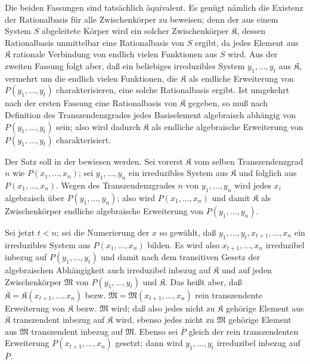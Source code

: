 Die beiden Fassungen sind tatsächlich äquivalent. Es genügt nämlich die Existenz der Rationalbasis für alle Zwischenkörper zu beweisen; denn der aus einem System $S$ abgeleitete Körper wird ein solcher Zwischenkörper $\mathfrak K$, dessen Rationalbasis unmittelbar eine Rationalbasis von $S$ ergibt, da jedes Element aus $\mathfrak K$ rationale Verbindung von endlich vielen Funktionen aus $S$ wird. Aus der zweiten Fassung folgt aber, daß ein beliebiges irreduzibles System $y_1,\ldots,y_t$ aus $\mathfrak K$, vermehrt um die endlich vielen Funktionen, die $\mathfrak K$ als endliche Erweiterung von $P(y_1,\ldots,y_t)$ charakterisieren, eine solche Rationalbasis ergibt. Ist umgekehrt nach der ersten Fassung eine Rationalbasis von $\mathfrak K$ gegeben, so muß nach Definition des Transzendenzgrades jedes Basiselement algebraisch abhängig von $P(y_1,\ldots,y_t)$ sein; also wird dadurch $\mathfrak K$ als endliche algebraische Erweiterung von $P(y_1,\ldots,y_t)$ charakterisiert.

Der Satz soll in der  bewiesen werden. Sei vorerst $\mathfrak K$ vom selben Transzendenzgrad $n$ wie $P(x_1,\ldots,x_n)$; sei $y_1,\ldots,y_n$ ein irreduzibles System aus $\mathfrak K$ und folglich aus $P(x_1,\ldots,x_n)$. Wegen des Transzendenzgrades $n$ von $y_1,\ldots,y_n$ wird jedes $x_i$ algebraisch über $P(y_1,\ldots,y_n)$; also wird $P(x_1,\ldots,x_n)$ und damit $\mathfrak K$ als Zwischenkörper endliche algebraische Erweiterung von $P(y_1,\ldots,y_n)$.

Sei jetzt $t<n$; sei die Numerierung der $x$ so gewählt, daß $y_1,\ldots,y_t,x_{t+1},\ldots,x_n$ ein irreduzibles System aus $P(x_1,\ldots,x_n)$ bilden. Es wird also $x_{t+1},\ldots,x_n$ irreduzibel inbezug auf $P(y_1,\ldots,y_t)$ und damit nach dem transitiven Gesetz der algebraischen Abhängigkeit auch irreduzibel inbezug auf $\mathfrak K$ und auf jeden Zwischenkörper $\mathfrak M$ von $P(y_1,\ldots,y_t)$ und $\mathfrak K$. Das heißt aber, daß $\overline{\mathfrak K}=\mathfrak K(x_{t+1},\ldots,x_n)$ bezw. $\overline{\mathfrak M}=\mathfrak M(x_{t+1},\ldots,x_n)$ rein transzendente Erweiterung von $\mathfrak K$ bezw. $\mathfrak M$ wird; daß also jedes nicht zu $\mathfrak K$ gehörige Element aus $\overline{\mathfrak K}$ transzendent inbezug auf $\mathfrak K$ wird, ebenso jedes nicht zu $\mathfrak M$ gehörige Element aus $\overline{\mathfrak M}$ transzendent inbezug auf $\mathfrak M$. Ebenso sei $\overline P$ gleich der rein transzendenten Erweiterung $P(x_{t+1},\ldots,x_n)$ gesetzt; dann wird $y_1,\ldots,y_t$ irreduzibel inbezug auf $\overline P$.

